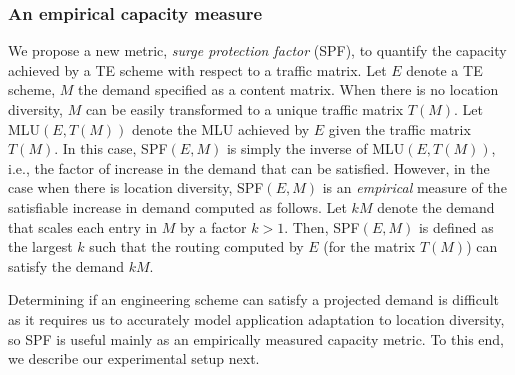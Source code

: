 \subsubsection{An empirical capacity measure}
\label{sec:SPFdefinition}

We propose a new metric, {\em surge protection factor} (SPF), to quantify the capacity achieved by a TE scheme with respect to a traffic matrix. Let $E$ denote a TE scheme, $M$ the demand specified as a content matrix. When there is no location diversity, $M$ can be easily transformed to a unique traffic matrix $T(M)$. Let  MLU$(E,T(M))$ denote the MLU achieved by $E$ given the traffic matrix $T(M)$. In this case, SPF$(E,M)$ is simply the inverse of MLU$(E,T(M))$, i.e., the factor of increase in the demand that can be satisfied. However, in the case when there is location diversity, SPF$(E,M)$ is an {\em empirical} measure of the satisfiable increase in demand computed as follows. Let $kM$ denote the demand that scales each entry in $M$ by a factor $k>1$. Then, SPF$(E,M)$ is defined as the largest $k$ such that the routing computed by $E$ (for the matrix $T(M)$) can satisfy the demand $kM$.

Determining if an engineering scheme can satisfy a projected demand is difficult as it requires us to accurately model application adaptation to location diversity, so SPF is useful mainly as an empirically measured capacity metric. To this end, we describe our experimental setup next.

